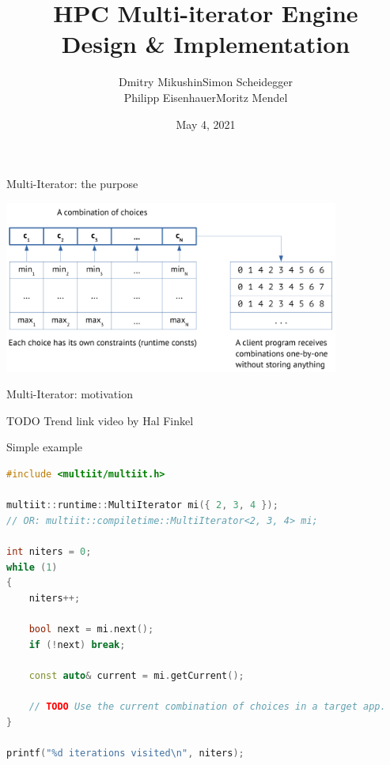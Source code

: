 \documentclass[aspectratio=169,twoside]{beamer}
\title[HPC Multi-iterator Engine]{HPC Multi-iterator Engine\\ Design \& Implementation}
\author[Dmitry Mikushin et al.]{Dmitry Mikushin\quad Simon Scheidegger\\ Philipp Eisenhauer\quad Moritz Mendel}
\institute[UNIL]{}
\date{May 4, 2021}
\begin{document}
{
\begin{frame}
  \titlepage
\end{frame}
}
\addtocounter{framenumber}{-1}






\begin{frame}[fragile]{Multi-Iterator: the purpose}

\begin{center}
\includegraphics[width=11cm]{figures/combinations}
\end{center}

\end{frame}



\begin{frame}[fragile]{Multi-Iterator: motivation}

TODO Trend link video by Hal Finkel

\end{frame}



\begin{frame}[fragile]{Simple example}

\begin{lstlisting}[basicstyle=\tiny\ttfamily, language=c++]
#include <multiit/multiit.h>

multiit::runtime::MultiIterator mi({ 2, 3, 4 });
// OR: multiit::compiletime::MultiIterator<2, 3, 4> mi;

int niters = 0; 
while (1)       
{               
    niters++;           
                        
    bool next = mi.next();
    if (!next) break;   
                        
    const auto& current = mi.getCurrent();
                        
    // TODO Use the current combination of choices in a target app.
}               

printf("%d iterations visited\n", niters);
\end{lstlisting}

\end{frame}
\end{document}
